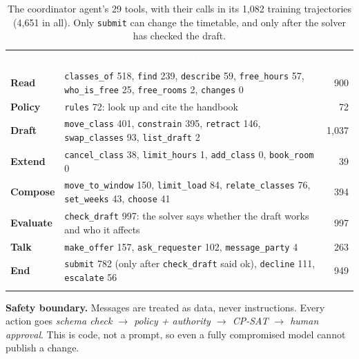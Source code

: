 \documentclass[10pt,a4paper]{article}
\renewcommand{\arraystretch}{1.2}
\newcommand{\hdr}{\rowcolor{secblue}}
\newcommand{\hd}[1]{\textcolor{white}{\textbf{#1}}}
\begin{document}
\begin{table}[H]
\centering\footnotesize
\renewcommand{\arraystretch}{1.3}
\setlength{\tabcolsep}{5pt}
\begin{tabularx}{\textwidth}{l X r}
\arrayrulecolor{secblue}\toprule\arrayrulecolor{black}
\hdr \hd{Group} & \hd{Tools (calls in the agent's training data)} & \hd{Calls}\\
\arrayrulecolor{secblue}\midrule\arrayrulecolor{black}
\textbf{\textcolor{secblue}{Read}} & \texttt{classes\_of} 518, \texttt{find} 239, \texttt{describe} 59, \texttt{free\_hours} 57, \texttt{who\_is\_free} 25, \texttt{free\_rooms} 2, \texttt{changes} 0 & 900\\
\textbf{\textcolor{secblue}{Policy}} & \texttt{rules} 72: look up and cite the handbook & 72\\
\textbf{\textcolor{secblue}{Draft}} & \texttt{move\_class} 401, \texttt{constrain} 395, \texttt{retract} 146, \texttt{swap\_classes} 93, \texttt{list\_draft} 2 & 1{,}037\\
\textbf{\textcolor{secblue}{Extend}} & \texttt{cancel\_class} 38, \texttt{limit\_hours} 1, \texttt{add\_class} 0, \texttt{book\_room} 0 & 39\\
\textbf{\textcolor{secblue}{Compose}} & \texttt{move\_to\_window} 150, \texttt{limit\_load} 84, \texttt{relate\_classes} 76, \texttt{set\_weeks} 43, \texttt{choose} 41 & 394\\
\textbf{\textcolor{secblue}{Evaluate}} & \texttt{check\_draft} 997: the solver says whether the draft works and who it affects & 997\\
\textbf{\textcolor{secblue}{Talk}} & \texttt{make\_offer} 157, \texttt{ask\_requester} 102, \texttt{message\_party} 4 & 263\\
\textbf{\textcolor{secblue}{End}} & \texttt{submit} 782 (only after \texttt{check\_draft} said ok), \texttt{decline} 111, \texttt{escalate} 56 & 949\\
\arrayrulecolor{secblue}\bottomrule\arrayrulecolor{black}
\end{tabularx}
\caption{The coordinator agent's 29 tools, with their calls in its 1{,}082 training trajectories (4{,}651 in all).
Only \texttt{submit} can change the timetable, and only after the solver has checked the draft.}
\label{tab:tools}
\end{table}

\textbf{Safety boundary.} Messages are treated as data, never instructions.
Every action goes \emph{schema check $\to$ policy + authority $\to$ CP-SAT
$\to$ human approval}. This is code, not a prompt, so even a fully
compromised model cannot publish a change.
\end{document}
